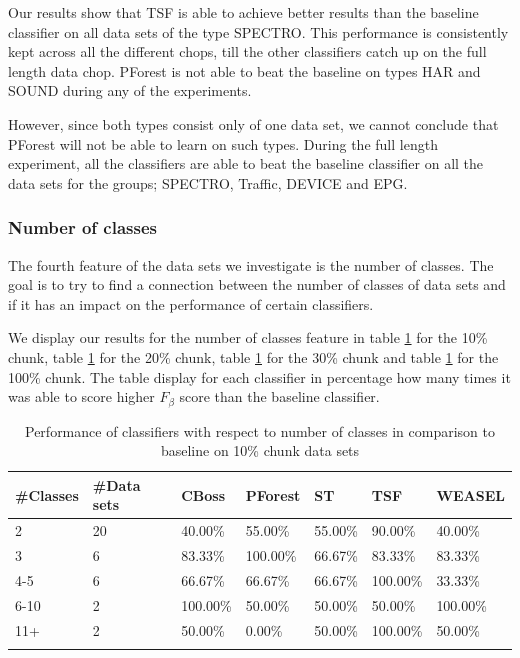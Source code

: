 Our results show that TSF is able to achieve better results than the baseline classifier on all data sets of the type SPECTRO.
This performance is consistently kept across all the different chops, till the other classifiers catch up on the full length data chop.
PForest is not able to beat the baseline on types HAR and SOUND during any of the experiments.

However, since both types consist only of one data set, we cannot conclude that PForest will not be able to learn on such types.
During the full length experiment, all the classifiers are able to beat the baseline classifier on all the data sets for the groups; SPECTRO, Traffic, DEVICE and EPG.


\subsubsection{Number of classes}
The fourth feature of the data sets we investigate is the number of classes.
The goal is to try to find a connection between the number of classes of data sets and if it has an impact on the performance of certain classifiers.

We display our results for the number of classes feature in table \ref{TableNumClass10} for the 10\% chunk, table \ref{TableNumClass10} for the 20\% chunk, table \ref{TableNumClass10} for the 30\% chunk and table \ref{TableNumClass10} for the 100\% chunk.
The table display for each classifier in percentage how many times it was able to score higher $F_{\beta}$ score than the baseline classifier.

\begin{table}[hp!]
	\setlength\extrarowheight{2pt} %
	\begin{tabularx}{\textwidth}{|X|X|X|X|X|X|X|}
	\hline
	\textbf{\#Classes} & \textbf{\#Data sets} & \textbf{CBoss} & \textbf{PForest} & \textbf{ST} & \textbf{TSF} & \textbf{WEASEL} \\ \hline
		2 & 20 & 40.00\% & 55.00\% & 55.00\% & 90.00\% & 40.00\% \\ \hline
		3 & 6 & 83.33\% & 100.00\% & 66.67\% & 83.33\% & 83.33\% \\ \hline
		4-5 & 6 & 66.67\% & 66.67\% & 66.67\% & 100.00\% & 33.33\% \\ \hline
		6-10 & 2 & 100.00\% & 50.00\% & 50.00\% & 50.00\% & 100.00\% \\ \hline
		11+ & 2 & 50.00\% & 0.00\% & 50.00\% & 100.00\% & 50.00\% \\ \hline
  \caption{Performance of classifiers with respect to number of classes in comparison to baseline on 10\% chunk data sets}
  \label{TableNumClass10}
  \end{tabularx}
\end{table}

